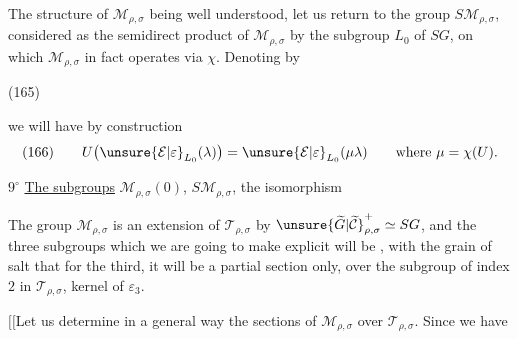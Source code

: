 The structure of $\mathcal M_{\rho,\sigma}$ being well understood,
let us return to the group $S\mathcal M_{\rho,\sigma}$, considered as
the semidirect product of $\mathcal M_{\rho,\sigma}$ by the subgroup
$L_0$ of $SG$, on which $\mathcal M_{\rho,\sigma}$ in fact operates
via $\chi$. Denoting by

\noindent (165)\quad
{}

we will have by  construction
\[
\text{(166)}\qquad
U\bigl(\unsure{\mathcal E|\varepsilon}_{L_0}(\lambda)\bigr)
=\unsure{\mathcal E|\varepsilon}_{L_0}(\mu\lambda)
\qquad\text{where }\mu=\chi(U).
\]




 \textcircled{$9^\circ$} \uline{The subgroups}
$\mathcal M_{\rho,\sigma}(0)$,
$S\mathcal M_{\rho,\sigma}$, the isomorphism

The group $\mathcal M_{\rho,\sigma}$ is an extension of $\mathcal T_{\rho,\sigma}$ by
$\unsure{\widetilde G|\widetilde{\mathcal C}}^+_{\rho,\sigma}\simeq SG$, and the three subgroups which we are going
to make explicit will be ,  with the
grain of salt that for the third, it will be a
partial section only, over the
subgroup  of index $2$ in $\mathcal T_{\rho,\sigma}$, kernel of
$\varepsilon_3$.

$[\![$Let us determine in a general way the sections
of $\mathcal M_{\rho,\sigma}$ over $\mathcal T_{\rho,\sigma}$. Since we have

